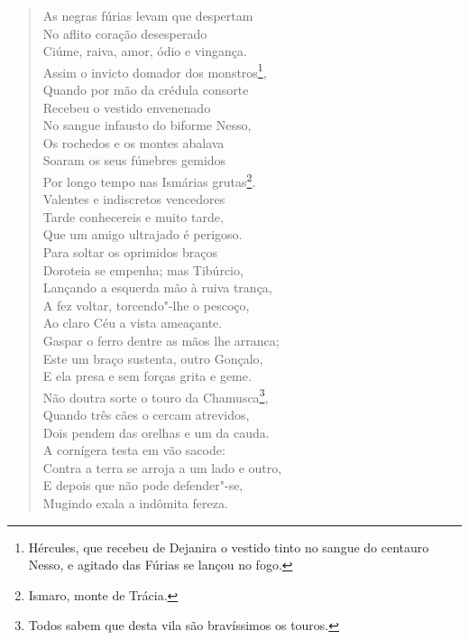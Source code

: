 \begin{verse}
As negras fúrias levam que despertam\\
No aflito coração desesperado\\
Ciúme, raiva, amor, ódio e vingança.\\
Assim o invicto domador dos monstros\footnote{ Hércules, que recebeu
de Dejanira o vestido tinto no sangue do centauro Nesso, e agitado das Fúrias se
lançou no fogo.},\\
Quando por mão da crédula consorte\\
Recebeu o vestido envenenado\\
No sangue infausto do biforme Nesso,\\
Os rochedos e os montes abalava\\ 
Soaram os seus fúnebres gemidos\\
Por longo tempo nas Ismárias grutas\footnote{ Ismaro, monte de Trácia.}.\\
Valentes e indiscretos vencedores\\
Tarde conhecereis e muito tarde,\\
Que um amigo ultrajado é perigoso. \\[10pt]


Para soltar os oprimidos braços\\
Doroteia se empenha; mas Tibúrcio,\\
Lançando a esquerda mão à ruiva trança,\\
A fez voltar, torcendo"-lhe o pescoço,\\
Ao claro Céu a vista ameaçante.\\
Gaspar o ferro dentre as mãos lhe arranca;\\
Este um braço sustenta, outro Gonçalo,\\
E ela presa e sem forças grita e geme.\\
Não doutra sorte o touro da Chamusca\footnote{ Todos sabem que desta
vila são bravíssimos os touros.},\\
Quando três cães o cercam atrevidos,\\
Dois pendem das orelhas e um da cauda.\\
A cornígera testa em vão sacode:\\
Contra a terra se arroja a um lado e outro,\\
E depois que não pode defender"-se,\\
Mugindo exala a indômita fereza. \\[10pt]
\end{verse}

\pagebreak
\thispagestyle{empty}

